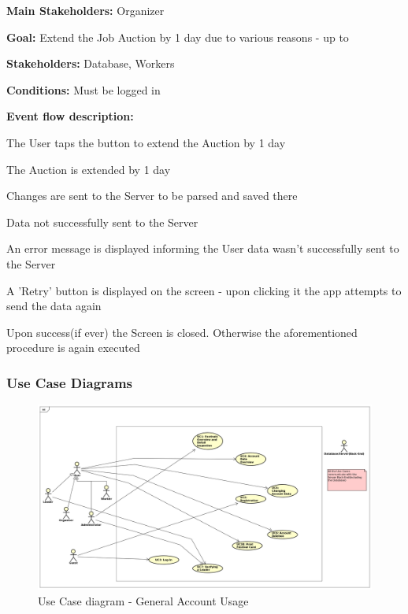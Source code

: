 			\noindent {}
			\begin{packed_item}
				\item \textbf{Main Stakeholders:} Organizer
				\item \textbf{Goal:} Extend the Job Auction by 1 day due to various reasons - up to 
				\item \textbf{Stakeholders: } Database, Workers
				\item \textbf{Conditions: } Must be logged in
				\item \textbf{Event flow description: }
				\begin{packed_enum}
					\item The User taps the button to extend the Auction by 1 day
					\item The Auction is extended by 1 day
					\item Changes are sent to the Server to be parsed and saved there
				\end{packed_enum}
				
				\begin{packed_item}
					\item[3.a] Data not successfully sent to the Server
					\item[] \begin{packed_enum}
						\item An error message is displayed informing the User data wasn't successfully sent to the Server
						\item A 'Retry' button is displayed on the screen - upon clicking it the app attempts to send the data again
						\item Upon success(if ever) the Screen is closed. Otherwise the aforementioned procedure is again executed
					\end{packed_enum}
				\end{packed_item}
			\end{packed_item}
			
			\subsubsection{Use Case Diagrams}		
				
				\begin{figure}[H]
					\includegraphics[width=\linewidth]{diagrams/uc-diag0-general.png}
					\caption{Use Case diagram - General Account Usage}
					\label{fig:uc_diag_0_general}
				\end{figure}
			
